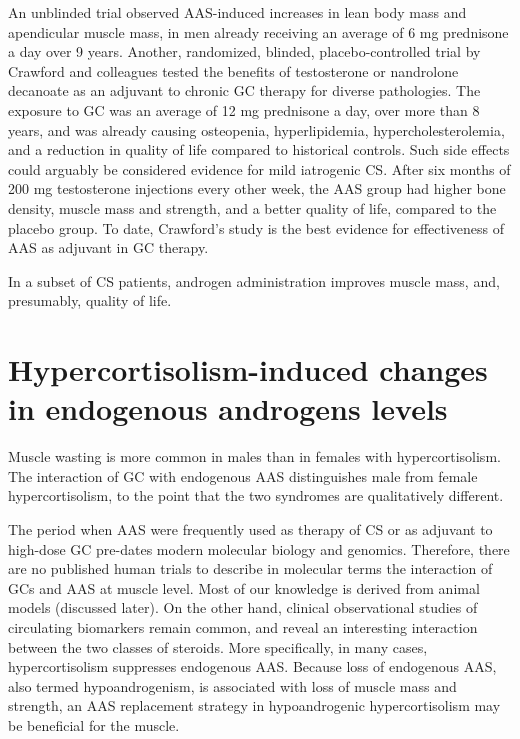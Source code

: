 \documentclass[12pt,english]{report}\usepackage[]{graphicx}\usepackage[]{color}
\begin{document}
An unblinded trial observed AAS-induced increases in lean body mass
and apendicular muscle mass, in men already receiving an average of
6 mg prednisone a day over 9 years\citep{ragnarsson2013effect}. Another,
randomized, blinded, placebo-controlled trial by Crawford and colleagues
tested the benefits of testosterone or nandrolone decanoate as an
adjuvant to chronic GC therapy for diverse pathologies\citep{crawford2003randomized}.
The exposure to GC was an average of 12 mg prednisone a day, over
more than 8 years, and was already causing osteopenia, hyperlipidemia,
hypercholesterolemia, and a reduction in quality of life compared
to historical controls\citep{vanschoor2006development}. Such side
effects could arguably be considered evidence for mild iatrogenic
CS. After six months of 200 mg testosterone injections every other
week, the AAS group had higher bone density, muscle mass and strength,
and a better quality of life, compared to the placebo group. To date,
Crawford's study is the best evidence for effectiveness of AAS as
adjuvant in GC therapy.

In a subset of CS patients, androgen administration improves muscle
mass, and, presumably, quality of life.


\section{Hypercortisolism-induced changes in endogenous androgens levels}

Muscle wasting is more common in males than in females with hypercortisolism\citep{pecorigiraldi2003gender-related}.
The interaction of GC with endogenous AAS distinguishes male from
female hypercortisolism, to the point that the two syndromes are qualitatively
different.

The period when AAS were frequently used as therapy of CS or as adjuvant
to high-dose GC pre-dates modern molecular biology and genomics. Therefore,
there are no published human trials to describe in molecular terms
the interaction of GCs and AAS at muscle level. Most of our knowledge
is derived from animal models (discussed later). On the other hand,
clinical observational studies of circulating biomarkers remain common,
and reveal an interesting interaction between the two classes of steroids.
More specifically, in many cases, hypercortisolism suppresses endogenous
AAS. Because loss of endogenous AAS, also termed hypoandrogenism,
is associated with loss of muscle mass and strength\citep{volpato2014prevalence,ramos1998muscle},
an AAS replacement strategy in hypoandrogenic hypercortisolism may
be beneficial for the muscle.
\end{document}
